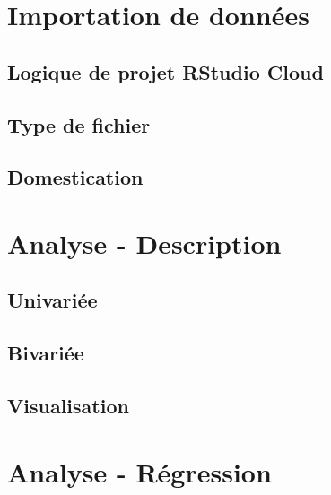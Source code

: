 \documentclass[10.5pt,a4paper]{article}
\begin{document}

  
\section{Importation de données}
  \subsection{Logique de projet RStudio Cloud}
  \subsection{Type de fichier}
  \subsection{Domestication}

  
\section{Analyse - Description}
  \subsection{Univariée}
  \subsection{Bivariée}
  \subsection{Visualisation}


\section{Analyse - Régression}
\end{document}
